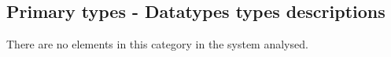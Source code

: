\subsection{Primary types - Datatypes types descriptions}



There are no elements in this category in the system analysed.


